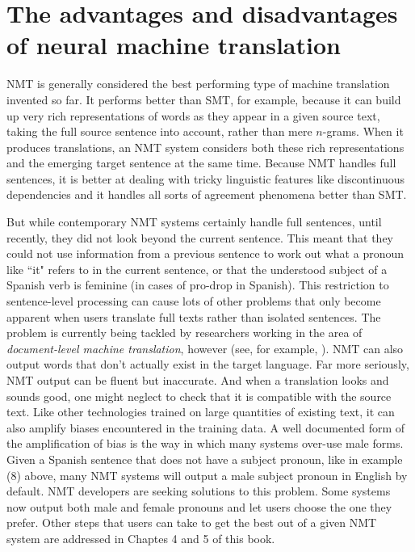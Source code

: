 \documentclass[output=paper]{langscibook}
\begin{document}
\section{The advantages and disadvantages of neural machine translation}\label{sec:kenny:7}
NMT is generally considered the best performing type of machine translation invented so far. It performs better than SMT, for example, because it can build up very rich representations of words as they appear in a given source text, taking the full source sentence into account, rather than mere $n$-grams. When it produces translations, an NMT system considers both these rich representations and the emerging target sentence at the same time. Because NMT handles full sentences, it is better at dealing with tricky linguistic features like discontinuous dependencies and it handles all sorts of agreement phenomena  better than  SMT. 

But while contemporary NMT systems certainly handle full sentences,  until recently, they did not look beyond the current sentence. This meant that they could not use information from a previous sentence to work out what a pronoun like “it" refers to in the current sentence, or that the understood subject of a Spanish verb is feminine (in cases of pro-drop in Spanish). This restriction to sentence-level processing can cause lots of other problems that only become apparent when users translate full texts rather than isolated sentences. The problem is currently being tackled by researchers working in the area of \textit{document-level machine translation}, however (see, for example, \citet{bao-etal-2021-g}). NMT can also output words that don't actually exist in the target language. Far more seriously, NMT output can be fluent but inaccurate. And when a translation looks and sounds good, one might neglect to check that it is compatible with the source text. Like other technologies trained on large quantities of existing text, it can also amplify biases encountered in the training data. A well documented form of the amplification of bias is the way in which many systems over-use male forms. Given a Spanish sentence that does not have a subject pronoun, like in example (8) above, many NMT systems will output a male subject pronoun in English by default. NMT developers are seeking solutions to this problem. Some systems now output both male and female pronouns and let users choose the one they prefer. Other steps that users can take to get the best out of a given NMT system are addressed in Chaptes 4 and 5 of this book. 
\end{document}
